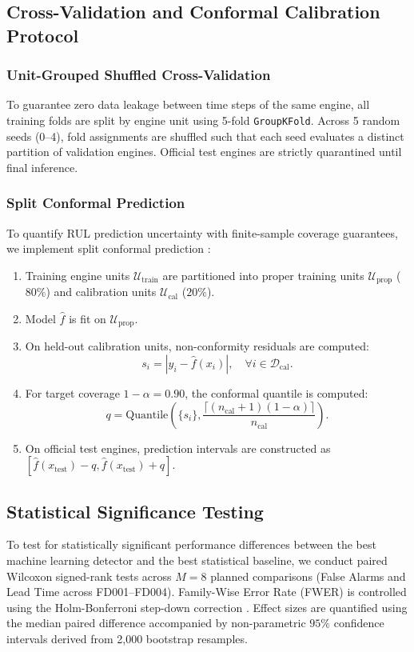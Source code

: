\subsection{Cross-Validation and Conformal Calibration Protocol}

\subsubsection{Unit-Grouped Shuffled Cross-Validation}
To guarantee zero data leakage between time steps of the same engine, all training folds are split by engine unit using 5-fold \texttt{GroupKFold}. Across 5 random seeds (0--4), fold assignments are shuffled such that each seed evaluates a distinct partition of validation engines. Official test engines are strictly quarantined until final inference.

\subsubsection{Split Conformal Prediction}
To quantify RUL prediction uncertainty with finite-sample coverage guarantees, we implement split conformal prediction \cite{angelopoulos2021gentle}:
\begin{enumerate}
    \item Training engine units $\mathcal{U}_{\text{train}}$ are partitioned into proper training units $\mathcal{U}_{\text{prop}}$ ($80\%$) and calibration units $\mathcal{U}_{\text{cal}}$ ($20\%$).
    \item Model $\hat{f}$ is fit on $\mathcal{U}_{\text{prop}}$.
    \item On held-out calibration units, non-conformity residuals are computed:
    $$s_i = |y_i - \hat{f}(x_i)|, \quad \forall i \in \mathcal{D}_{\text{cal}}.$$
    \item For target coverage $1 - \alpha = 0.90$, the conformal quantile is computed:
    $$q = \text{Quantile}\left(\{s_i\}, \frac{\lceil (n_{\text{cal}} + 1)(1 - \alpha) \rceil}{n_{\text{cal}}}\right).$$
    \item On official test engines, prediction intervals are constructed as $[\hat{f}(x_{\text{test}}) - q, \hat{f}(x_{\text{test}}) + q]$.
\end{enumerate}

\subsection{Statistical Significance Testing}
To test for statistically significant performance differences between the best machine learning detector and the best statistical baseline, we conduct paired Wilcoxon signed-rank tests across $M=8$ planned comparisons (False Alarms and Lead Time across FD001--FD004). 
Family-Wise Error Rate (FWER) is controlled using the Holm-Bonferroni step-down correction \cite{holm1979simple}. Effect sizes are quantified using the median paired difference accompanied by non-parametric $95\%$ confidence intervals derived from 2,000 bootstrap resamples.
